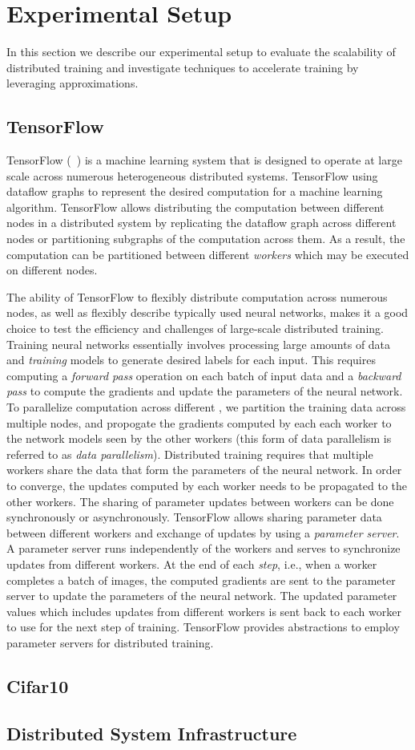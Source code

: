 \section{Experimental Setup}
In this section we describe our experimental setup to evaluate the scalability of distributed training and investigate techniques to accelerate training by leveraging approximations. 
\subsection{TensorFlow}
TensorFlow (~\cite{tensorflow}) is a machine learning system that is designed to operate at large scale across numerous heterogeneous distributed systems. TensorFlow using dataflow graphs to represent the desired computation for a machine learning algorithm. TensorFlow allows distributing the computation between different nodes in a distributed system by replicating the dataflow graph across different nodes or partitioning subgraphs of the computation across them. As a result, the computation can be partitioned between different \emph{workers} which may be executed on different nodes. 

The ability of TensorFlow to flexibly distribute computation across numerous nodes, as well as flexibly describe typically used neural networks, makes it a good choice to test the efficiency and challenges of large-scale distributed training. Training neural networks essentially involves processing large amounts of data and \emph{training} models to generate desired labels for each input. This requires computing a \emph{forward pass} operation on each batch of input data and a \emph{backward pass} to compute the gradients and update the parameters of the neural network. To parallelize computation across different , we partition the training data across multiple nodes, and propogate the gradients computed by each each worker to the network models seen by the other workers (this form of data parallelism is referred to as \emph{data parallelism}). Distributed training requires that multiple workers share the data that form the parameters of the neural network. In order to converge, the updates computed by each worker needs to be propagated to the other workers. The sharing of parameter updates between workers can be done synchronously or asynchronously. TensorFlow allows sharing parameter data between different workers and exchange of updates by using a \emph{parameter server}\cite{parameter_server}. A parameter server runs independently of the workers and serves to synchronize updates from different workers. At the end of each \emph{step}, i.e., when a worker completes a batch of images, the computed gradients are sent to the parameter server to update the parameters of the neural network. The 
updated parameter values which includes updates from different workers is sent back to each worker to use for the next step of training.
TensorFlow provides abstractions to employ parameter servers for distributed training. 

\subsection{Cifar10}
\subsection{Distributed System Infrastructure}
